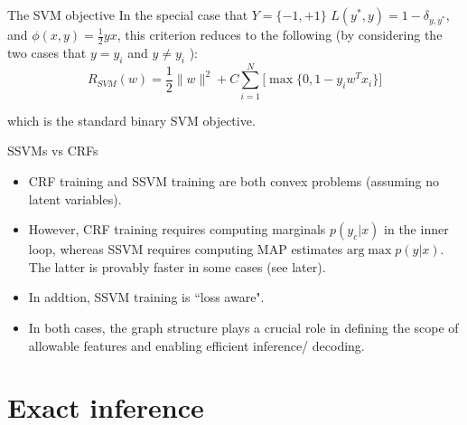 \documentclass[10pt,mathserif]{beamer}
\begin{document}
\begin{frame}{The SVM objective}
In the special case that $Y=\{-1,+1\}$ $L(y^*,y)=1-\delta_{y,y^*}$, and $\phi(x, y ) = \frac{1}{2} y x$, this criterion reduces to the following (by considering the two cases that $y = y_i$ and $y \neq y_i$ ):
\begin{equation}
        R_{SVM}(w) = \frac{1}{2}\|w\|^2 + C\sum_{i=1}^N\bigg[\max\{0,1-y_i w^T x_i\}\bigg]
\end{equation}

which is the standard binary SVM objective.
\end{frame}

\begin{frame}{SSVMs vs CRFs}
\begin{itemize}
    \item CRF training and SSVM training are both convex problems (assuming no latent variables).
    \item However, CRF training requires computing marginals $p(y_c|x)$   in the inner loop, whereas SSVM requires computing MAP estimates $\text{arg}\max p(y|x)$. The latter is provably faster in some cases (see later).
    \item In addtion, SSVM training is ``loss aware".
    \item In both cases, the graph structure plays a crucial role in defining the scope of allowable features and enabling efficient inference/ decoding.
\end{itemize}
\end{frame}

\section{Exact inference}
\end{document}
